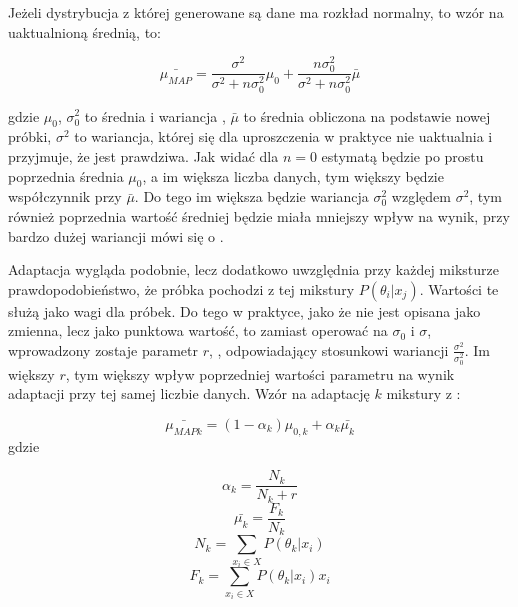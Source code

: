 Jeżeli dystrybucja z której generowane są dane ma rozkład normalny, to wzór na uaktualnioną średnią, to:

$$\bar{\mu_{MAP}} = \frac{\sigma^2}{\sigma^2 + n \sigma_0^2} \mu_0 + \frac{n \sigma^2_0}{\sigma^2 + n \sigma_0^2} \bar{\mu}$$

gdzie $\mu_0$, $\sigma_0^2$ to średnia i wariancja , $\bar{\mu}$ to średnia obliczona na podstawie nowej próbki, $\sigma^2$ to wariancja, której się dla uproszczenia w praktyce nie uaktualnia i przyjmuje, że jest prawdziwa. Jak widać
dla $n = 0$  estymatą będzie po prostu poprzednia średnia $\mu_0$, a im większa liczba danych, tym
większy będzie współczynnik przy $\bar{\mu}$. Do tego im większa będzie wariancja  $\sigma_0^2$ względem
$\sigma^2$, tym również poprzednia wartość średniej będzie miała mniejszy wpływ na wynik, przy bardzo dużej wariancji
mówi się o \cite{fundamentalsOfSpeech}.

Adaptacja  wygląda podobnie, lecz dodatkowo uwzględnia przy każdej miksturze prawdopodobieństwo,
że próbka pochodzi z tej mikstury $P(\theta_i | x_j)$. Wartości te służą jako wagi dla próbek. Do tego w
praktyce, jako że  nie jest opisana jako zmienna, lecz jako punktowa wartość, to zamiast
operować na $\sigma_0$ i $\sigma$, wprowadzony zostaje parametr $r$, , odpowiadający
stosunkowi wariancji $\frac{\sigma^2}{\sigma_0^2}$. Im większy $r$, tym większy wpływ poprzedniej wartości
parametru na wynik adaptacji przy tej samej liczbie danych. Wzór na adaptację $k$ mikstury z \cite{comparisonOfMultiple}:

$$\bar{\mu_{MAP k}} = (1 - \alpha_k) \mu_{0,k} + \alpha_k \bar{\mu_k}$$
gdzie

$$\alpha_k = \frac{N_k}{N_k + r}$$
$$\bar{\mu_k} = \frac{F_k}{N_k}$$
$$N_k = \sum_{x_i \in X} P(\theta_k | x_i)$$
$$F_k = \sum_{x_i \in X} P(\theta_k | x_i) x_i$$



%

